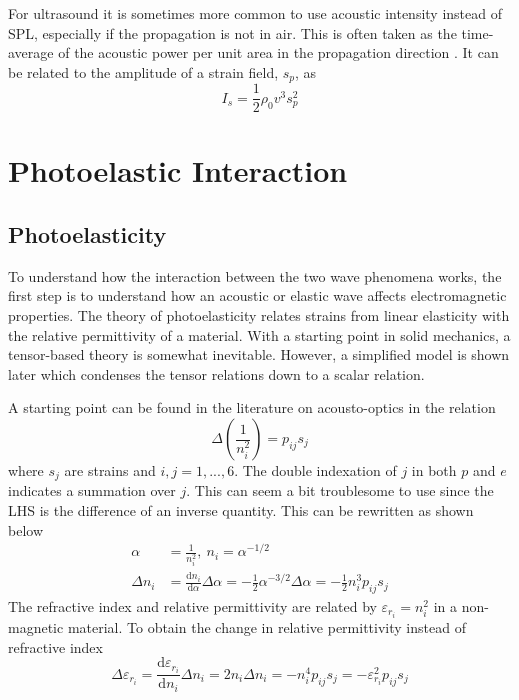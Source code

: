 \documentclass[11pt,twoside]{eitExjobb}
\begin{document}
	For ultrasound it is sometimes more common to use acoustic intensity instead of SPL, especially if the propagation is not in air. This is often taken as the time-average of the acoustic power per unit area in the propagation direction \cite{Rossing2014}. It can be related to the amplitude of a strain field, $s_p$, as \cite{Saleh2007}
	\begin{equation*}
		I_s = \frac{1}{2} \rho_0 v^3 s_p^2
	\end{equation*}
	
	\section{Photoelastic Interaction}
	
	\subsection{Photoelasticity}
	To understand how the interaction between the two wave phenomena works, the first step is to understand how an acoustic or elastic wave affects electromagnetic properties. The theory of photoelasticity relates strains from linear elasticity with the relative permittivity of a material. With a starting point in solid mechanics, a tensor-based theory is somewhat inevitable. However, a simplified model is shown later which condenses the tensor relations down to a scalar relation.
	
	A starting point can be found in the literature on acousto-optics in the relation \cite{Korpel1988}
	\begin{equation*}
		\Delta \left( \frac{1}{n_i^2} \right) = p_{ij} s_j
	\end{equation*}
	where $s_j$ are strains and $i,j = 1,...,6$. The double indexation of $j$ in both $p$ and $e$ indicates a summation over $j$. This can seem a bit troublesome to use since the LHS is the difference of an inverse quantity. This can be rewritten as shown below
	\begin{align*}
		\alpha &= \frac{1}{n_i^2},\ n_i = \alpha^{-1/2} \\
		\Delta n_i &= \frac{\mathrm{d}n_i}{\mathrm{d}\alpha} \Delta \alpha = -\frac{1}{2} \alpha^{-3/2} \Delta \alpha = -\frac{1}{2} n_i^3 p_{ij} s_j
	\end{align*}
	The refractive index and relative permittivity are related by $\varepsilon_{r_i} = n_i^2$ in a non-magnetic material. To obtain the change in relative permittivity instead of refractive index
	\begin{equation*}
		\Delta \varepsilon_{r_i} = \frac{\mathrm{d}\varepsilon_{r_i}}{\mathrm{d}n_i} \Delta n_i = 2n_i \Delta n_i = -n_i^4 p_{ij} s_j = -\varepsilon_{r_i}^2 p_{ij} s_j
	\end{equation*}
	
\end{document}

